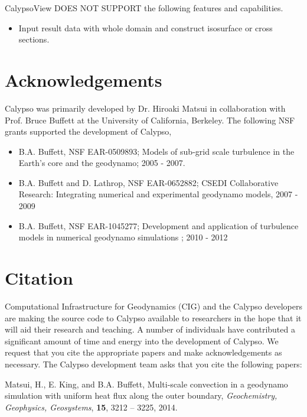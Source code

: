 CalypsoView DOES NOT SUPPORT the following features and capabilities.
%
\begin{itemize}
\item Input result data with whole domain and construct isosurface or cross sections.
\end{itemize}
%


\section{Acknowledgements}
\label{section:acknowledgements}
Calypso was primarily developed by Dr. Hiroaki Matsui in collaboration with Prof. Bruce Buffett at the University of California, Berkeley. The following NSF grants supported the development of Calypso, 
%
\begin{itemize}
\item B.A. Buffett, NSF EAR-0509893; Models of sub-grid scale turbulence in the Earth's core and the geodynamo; 2005 - 2007.
\item B.A. Buffett and D. Lathrop,  NSF EAR-0652882; CSEDI Collaborative Research: Integrating numerical and experimental geodynamo models, 2007 - 2009
\item B.A. Buffett, NSF EAR-1045277; Development and application of turbulence models in numerical geodynamo simulations ;  2010 - 2012
\end{itemize}
%

\section{Citation}
\label{section:citation}

Computational Infrastructure for Geodynamics (CIG) and the Calypso developers are making the source code to Calypso available to researchers in the hope that it will aid their research and teaching. A number of individuals have contributed a significant amount of time and energy into the development of Calypso. We request that you cite the appropriate papers and make acknowledgements as necessary. The Calypso development team asks that you cite the following papers:

Matsui, H., E. King, and B.A. Buffett, Multi-scale convection in a geodynamo simulation with uniform heat flux along the outer boundary, {\it Geochemistry, Geophysics, Geosystems}, {\bf 15}, 3212 -- 3225, 2014.
